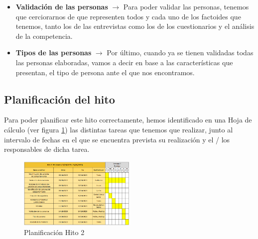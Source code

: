 \begin{itemize}
    \item \textbf{Validación de las personas} $\rightarrow$ Para poder validar las personas, tenemos que cerciorarnos de que representen todos y cada uno de los factoides que tenemos, tanto los de las entrevistas como los de los cuestionarios y el análisis de la competencia.
    \item \textbf{Tipos de las personas} $\rightarrow$ Por último, cuando ya se tienen validadas todas las personas elaboradas, vamos a decir en base a las características que presentan, el tipo de persona ante el que nos encontramos.
\end{itemize}

\subsection{Planificación del hito}
Para poder planificar este hito correctamente, hemos identificado en una Hoja de cálculo (ver figura \ref{fig:planif-hito2}) las distintas tareas que tenemos que 
realizar, junto al intervalo de fechas en el que se encuentra prevista su realización y el / los responsables de dicha tarea.

\begin{figure}[H]
    \centering 
    \includegraphics[width=0.5\textwidth]{./Imagenes/Planificaciones/Planif-hito2.png}
    \caption{Planificación Hito 2}
    \label{fig:planif-hito2}
\end{figure}

